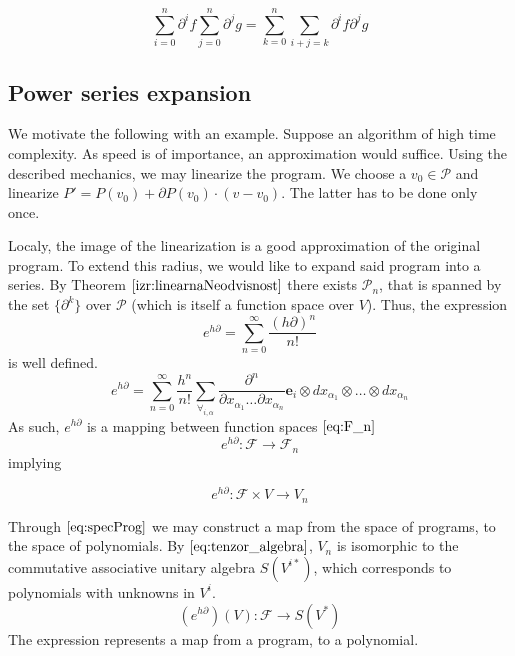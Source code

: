 \documentclass{article}
\newcommand{\e}{\mathbf{e}}
\newcommand{\F}{\mathcal{F}}
\newcommand{\dP}{\mathcal{P}}
\newcommand{\D}{\partial}
\begin{document}
\begin{equation}\label{eq:P_prod}
	\sum\limits_{i=0}^{n}\D^if\sum\limits_{j=0}^{n}\D^jg=\sum\limits_{k=0}^{n}\sum\limits_{i+j=k}\D^if\D^jg
\end{equation}

 \subsection{Power series expansion}\label{sec:Vrsta}
 
 We motivate the following with an example. Suppose an algorithm of high time complexity. As speed is of importance, an approximation would suffice. Using the described mechanics, we may linearize the program. We choose a $v_0\in\dP$ and linearize $P'=P(v_0)+\D P(v_0)\cdot(v-v_0)$. The latter has to be done only once.
 
 Localy, the image of the linearization is a good approximation of the original program. To extend this radius, we would like to expand said program into a series. By Theorem $\ref{izr:linearnaNeodvisnost}$  there exists $\dP_n$, that is spanned by the set $\{\D^k\}$ over $\dP$ (which is itself a function space over $V$). Thus, the expression
 \begin{equation}
 	e^{h\D}=\sum\limits_{n=0}^{\infty}\frac{(h\D)^n}{n!}
 \end{equation}
 is well defined.
 \begin{equation}\label{eq:e^d}
 	e^{h\D}=\sum\limits_{n=0}^{\infty}\frac{h^n}{n!}\sum_{\forall_{i,\alpha}}\frac{\partial^n}{\partial
 		    x_{\alpha_1}\ldots \partial x_{\alpha_n}}\e_i\otimes
 		  dx_{\alpha_1}\otimes\ldots \otimes dx_{\alpha_n}
 \end{equation}
As such, $e^{h\D}$ is a mapping between function spaces $\eqref{eq:F_n}$
 \begin{equation}
 	e^{h\D}:\F\to\F_n
 \end{equation}
 implying
  
  \begin{equation}\label{eq:specProg}
  	e^{h\D}:\F\times V\to V_n
  \end{equation}
  
Through $\eqref{eq:specProg}$ we may construct a map from the space of programs, to the space of polynomials. By $\eqref{eq:tenzor_algebra}$, $V_n$ is isomorphic to the commutative associative unitary algebra $S(V^{i*})$, which corresponds to polynomials with unknowns in $V^i$.
 \begin{equation}\label{eq:pToPol}
 	(e^{h\D})(V): \F\to S(V^*)
 \end{equation}
 The expression represents a map from a program, to a polynomial. 
 
\end{document}
